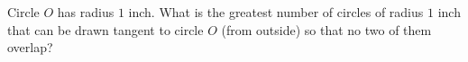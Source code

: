 Circle $O$ has radius $1$ inch. What is the greatest number of circles of radius $1$ inch that can be drawn tangent to circle $O$ (from outside) so that no two of them overlap?
